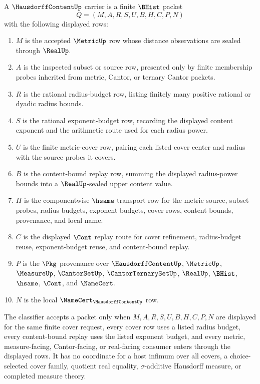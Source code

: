 \begin{definition}
\label{def:hausdorff-content-carrier}
A $\HausdorffContentUp$ carrier is a finite $\BHist$ packet
$$
Q=(M,A,R,S,U,B,H,C,P,N)
$$
with the following displayed rows:
\begin{enumerate}
\item $M$ is the accepted $\MetricUp$ row whose distance observations are sealed through $\RealUp$.
\item $A$ is the inspected subset or source row, presented only by finite membership probes inherited from metric, Cantor, or ternary Cantor packets.
\item $R$ is the rational radius-budget row, listing finitely many positive rational or dyadic radius bounds.
\item $S$ is the rational exponent-budget row, recording the displayed content exponent and the arithmetic route used for each radius power.
\item $U$ is the finite metric-cover row, pairing each listed cover center and radius with the source probes it covers.
\item $B$ is the content-bound replay row, summing the displayed radius-power bounds into a $\RealUp$-sealed upper content value.
\item $H$ is the componentwise $\hsame$ transport row for the metric source, subset probes, radius budgets, exponent budgets, cover rows, content bounds, provenance, and local name.
\item $C$ is the displayed $\Cont$ replay route for cover refinement, radius-budget reuse, exponent-budget reuse, and content-bound replay.
\item $P$ is the $\Pkg$ provenance over $\HausdorffContentUp$, $\MetricUp$, $\MeasureUp$, $\CantorSetUp$, $\CantorTernarySetUp$, $\RealUp$, $\BHist$, $\hsame$, $\Cont$, and $\NameCert$.
\item $N$ is the local $\NameCert_{\HausdorffContentUp}$ row.
\end{enumerate}
The classifier accepts a packet only when $M,A,R,S,U,B,H,C,P,N$ are displayed for the same finite cover request, every cover row uses a listed radius budget, every content-bound replay uses the listed exponent budget, and every metric, measure-facing, Cantor-facing, or real-facing consumer enters through the displayed rows. It has no coordinate for a host infimum over all covers, a choice-selected cover family, quotient real equality, $\sigma$-additive Hausdorff measure, or completed measure theory.
\end{definition}


